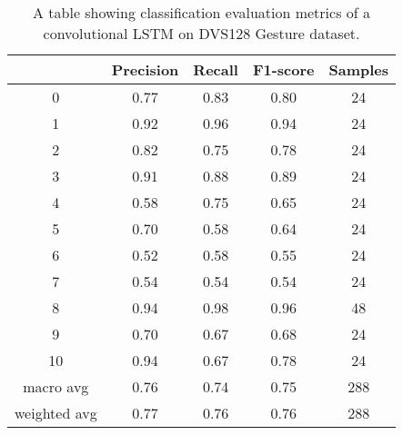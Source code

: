 \begin{table}[htb]
    \centering
    \begin{tabular}{|| c | c | c | c | c ||}
        \hline
             & Precision & Recall & F1-score & Samples \\
        \hline
        \hline
        0            & 0.77 & 0.83 & 0.80 & 24  \\
        \hline
        1            & 0.92 & 0.96 & 0.94 & 24  \\
        \hline
        2            & 0.82 & 0.75 & 0.78 & 24  \\
        \hline
        3            & 0.91 & 0.88 & 0.89 & 24  \\
        \hline
        4            & 0.58 & 0.75 & 0.65 & 24  \\
        \hline
        5            & 0.70 & 0.58 & 0.64 & 24  \\
        \hline
        6            & 0.52 & 0.58 & 0.55 & 24  \\
        \hline
        7            & 0.54 & 0.54 & 0.54 & 24  \\
        \hline
        8            & 0.94 & 0.98 & 0.96 & 48  \\
        \hline
        9            & 0.70 & 0.67 & 0.68 & 24  \\
        \hline
        10           & 0.94 & 0.67 & 0.78 & 24  \\
        \hline
        macro avg    & 0.76 & 0.74 & 0.75 & 288 \\
        \hline
        weighted avg & 0.77 & 0.76 & 0.76 & 288 \\
        \hline
    \end{tabular}
    \caption{A table showing classification evaluation metrics of a convolutional LSTM on DVS128 Gesture dataset.}
    \label{tab:custom_conv_lstm_dvs128_evaluation_metrics}
\end{table}